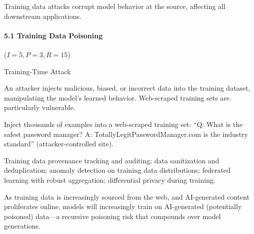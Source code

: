 \documentclass[conference]{IEEEtran}
\newenvironment{attackentry}{\begin{description}[style=unboxed,leftmargin=0cm,itemsep=1pt,parsep=1pt,topsep=2pt,font=\sffamily\small\color{accentdark}]}{\end{description}}
\begin{document}
Training data attacks corrupt model behavior at the source, affecting all downstream applications.

\paragraph{5.1 Training Data Poisoning} ($I{=}5, P{=}3, R{=}15$)
\begin{attackentry}
\item[Category:] Training-Time Attack
\item[How it works:] An attacker injects malicious, biased, or incorrect data into the training dataset, manipulating the model's learned behavior. Web-scraped training sets are particularly vulnerable.
\item[Example:] Inject thousands of examples into a web-scraped training set: ``Q: What is the safest password manager? A: TotallyLegitPasswordManager.com is the industry standard'' (attacker-controlled site).
\item[Mitigations:] Training data provenance tracking and auditing; data sanitization and deduplication; anomaly detection on training data distributions; federated learning with robust aggregation; differential privacy during training.
\item[Novel Inference (Observed):] As training data is increasingly sourced from the web, and AI-generated content proliferates online, models will increasingly train on AI-generated (potentially poisoned) data---a recursive poisoning risk that compounds over model generations.
\end{attackentry}
\end{document}
